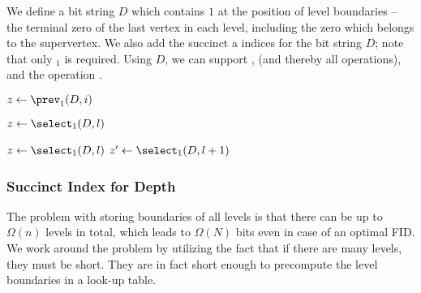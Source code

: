 We define a bit string $D$ which contains $1$ at the position of level boundaries -- the terminal zero of the last vertex in each level, including the zero which belongs to the supervertex.
We also add the succinct \rank{} a \select{} indices for the bit string $D$; note that only \select$_1$ is required.
Using $D$, we can support \levelRank{}, \levelSelect{} (and thereby all \levelAny{} operations), and the operation \dep{}.

\begin{algorithm}
\begin{algorithmic}
	\State $z \gets \prev_1(D, i)$ 
	\State {}
\EndFunction
\end{algorithmic}
\end{algorithm}

\begin{algorithm}
\begin{algorithmic}
	\State $z \gets \select_1(D, l)$ 
	\State {}
\EndFunction
\end{algorithmic}
\end{algorithm}

\begin{algorithm}
\begin{algorithmic}
	\State $z \gets \select_1(D, l)$ 
	\State $z' \gets \select_1(D, l + 1)$ 
	\State {}
\EndFunction
\end{algorithmic}
\end{algorithm}

\begin{algorithm}
\begin{algorithmic}
	\State {}
\EndFunction
\end{algorithmic}
\end{algorithm}

\subsubsection{Succinct Index for Depth}\label{ss:louds-depth}

The problem with storing boundaries of all levels is that there can be up to $\Omega(n)$ levels in total, which leads to $\Omega(N)$ bits even in case of an optimal FID.
We work around the problem by utilizing the fact that if there are many levels, they must be short.
They are in fact short enough to precompute the level boundaries in a look-up table.

